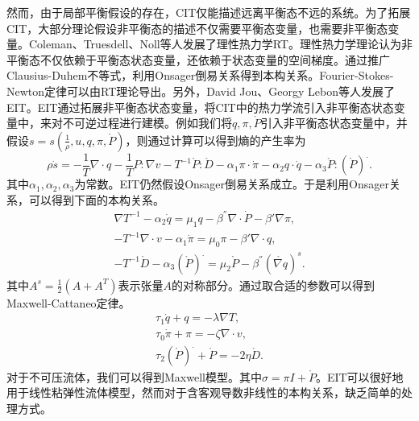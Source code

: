 然而，由于局部平衡假设的存在，CIT仅能描述远离平衡态不远的系统。为了拓展CIT，大部分理论假设非平衡态的描述不仅需要平衡态变量，也需要非平衡态变量。Coleman、Truesdell、Noll等人发展了理性热力学RT。理性热力学理论认为非平衡态不仅依赖于平衡态状态变量，还依赖于状态变量的空间梯度。通过推广Clausius-Duhem不等式，利用Onsager倒易关系得到本构关系。Fourier-Stokes-Newton定律可以由RT理论导出\cite{jou1996extended}。另外，David Jou、Georgy Lebon等人发展了EIT。EIT通过拓展非平衡态状态变量，将CIT中的热力学流引入非平衡态状态变量中，来对不可逆过程进行建模。例如我们将$q,\pi,\mathring{P}$引入非平衡态状态变量中，并假设$s = s(\frac{1}{\rho}, u,q,\pi,\mathring{P} )$，则通过计算可以得到熵的产生率为
\begin{equation*}
		\rho \dot{s} = - \frac{1}{T} \nabla \cdot q - \frac{1}{T} P: \nabla v - T^{-1} \mathring{P} : \mathring{D} - \alpha_1 \pi \cdot \dot{\pi} - \alpha_2 q \cdot \dot{q} - \alpha_3 \mathring{P} : ({\mathring{P} })^. .
\end{equation*}
其中$\alpha_1,\alpha_2,\alpha_3$为常数。EIT仍然假设Onsager倒易关系成立。于是利用Onsager关系，可以得到下面的本构关系。
\begin{subequations} \label{eq:EITconstitutive}
		\begin{align}
	\nabla T^{-1} - \alpha_2 \dot{q} = \mu_1 q - \beta^{''}\nabla \cdot \dot{P} - \beta' \nabla \pi, \\
	-T^{-1} \nabla \cdot v - \alpha_1 \dot{\pi} = \mu_0 \pi - \beta' \nabla \cdot q , \\
	-T^{-1} \mathring{D} - \alpha_3 (\mathring{P})^. = \mu_2 \mathring{P} - \beta^{''} (\mathring{\nabla q})^s. 
		\end{align}
\end{subequations}
其中$A^s = \frac{1}{2} (A+A^T)$表示张量$A$的对称部分。通过取合适的参数可以得到Maxwell-Cattaneo定律。
\begin{eqnarray*}
	\tau_1 \dot{q} + q = - \lambda \nabla T, \\
 	\tau_0 \dot{\pi } + \pi = -\zeta \nabla \cdot v, \\
 	\tau_2 (\mathring{P})^. + \mathring{P} = -2 \eta \mathring{D}.
\end{eqnarray*}
对于不可压流体，我们可以得到Maxwell模型。其中$\sigma = \pi I + \mathring{P} $。EIT可以很好地用于线性粘弹性流体模型，然而对于含客观导数非线性的本构关系，缺乏简单的处理方式\cite{jou1996extended}。

